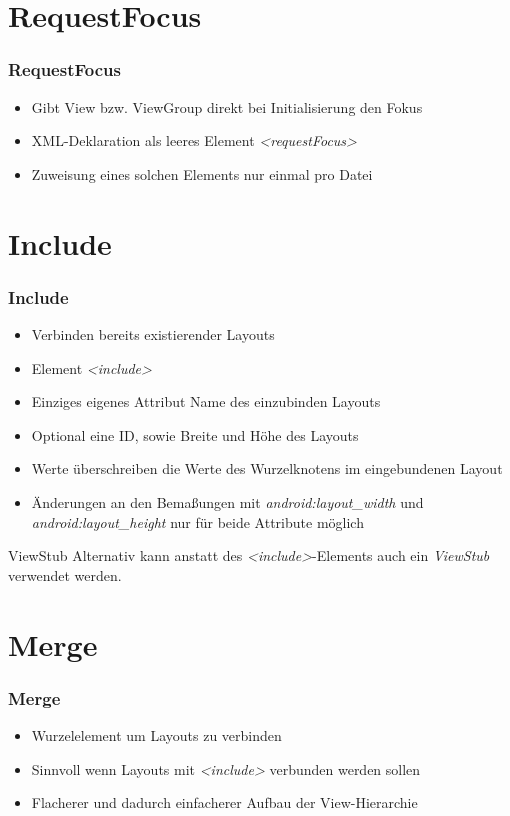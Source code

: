 \section{RequestFocus}
\begin{frame}
   \frametitle{RequestFocus}
   \begin{itemize}
      \item Gibt View bzw. ViewGroup direkt bei Initialisierung den Fokus
      \item XML-Deklaration als leeres Element \emph{\textless{}requestFocus\textgreater}
      \item Zuweisung eines solchen Elements nur einmal pro Datei
   \end{itemize}
\end{frame}

\section{Include}
\begin{frame}
   \frametitle{Include}
   \begin{itemize}
      \item Verbinden bereits existierender Layouts
      \item Element \emph{\textless{}include\textgreater}
      \item Einziges eigenes Attribut Name des einzubinden Layouts
      \item Optional eine ID, sowie Breite und Höhe des Layouts
      \item Werte überschreiben die Werte des Wurzelknotens im eingebundenen Layout
      \item Änderungen an den Bemaßungen mit \emph{android:layout\_width} und 
      	\emph{android:layout\_height} nur für beide Attribute möglich
   \end{itemize}

   \begin{alertblock}{ViewStub}
      Alternativ kann anstatt des \emph{\textless{}include\textgreater}-Elements 
      auch ein \emph{ViewStub} verwendet werden.
   \end{alertblock}
\end{frame}

\section{Merge}
\begin{frame}
   \frametitle{Merge}
   \begin{itemize}
      \item Wurzelelement um Layouts zu verbinden
      \item Sinnvoll wenn Layouts mit \emph{\textless{}include\textgreater} 
         verbunden werden sollen
      \item Flacherer und dadurch einfacherer Aufbau der View-Hierarchie
   \end{itemize}
\end{frame}
